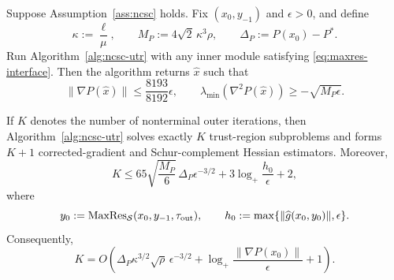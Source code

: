 \begin{theorem}
\label{thm:ncsc-complexity}
Suppose Assumption~\ref{ass:ncsc} holds.
Fix $(x_0,y_{-1})$ and $\epsilon>0$, and define
\[
    \kappa:=\frac{\ell}{\mu},
    \qquad
    M_P:=4\sqrt2\,\kappa^3\rho,
    \qquad
    \Delta_P:=P(x_0)-P^*.
\]
Run Algorithm~\ref{alg:ncsc-utr} with any inner module satisfying
\eqref{eq:maxres-interface}. Then the algorithm returns
$\widehat x$ such that
\begin{equation}
    \|\nabla P(\widehat x)\|
    \le
    \frac{8193}{8192}\epsilon,
    \qquad
    \lambda_{\min}(\nabla^2P(\widehat x))
    \ge
    -\sqrt{M_P\epsilon}.
    \label{eq:ncsc-return}
\end{equation}

If $K$ denotes the number of nonterminal outer iterations, then
Algorithm~\ref{alg:ncsc-utr} solves exactly $K$ trust-region
subproblems and forms $K+1$ corrected-gradient and
Schur-complement Hessian estimators. Moreover,
\begin{equation}
    K
    \le
    65\sqrt{\frac{M_P}{6}}\,
    \Delta_P\epsilon^{-3/2}
    +
    3\log_+\frac{h_0}{\epsilon}
    +2,
    \label{eq:ncsc-outer-explicit}
\end{equation}
where
\[
    y_0
    :=
    \operatorname{MaxRes}_{\mathcal S}
    (x_0,y_{-1},\tau_{\rm out}),
    \qquad
    h_0
    :=
    \max\{\|\widehat g(x_0,y_0)\|,\epsilon\}.
\]
Consequently,
\begin{equation}
    K
    =
    O\!\left(
        \Delta_P
        \kappa^{3/2}\sqrt\rho\,
        \epsilon^{-3/2}
        +
        \log_+
        \frac{\|\nabla P(x_0)\|}{\epsilon}
        +1
    \right).
    \label{eq:ncsc-outer-complexity}
\end{equation}


\end{theorem}
